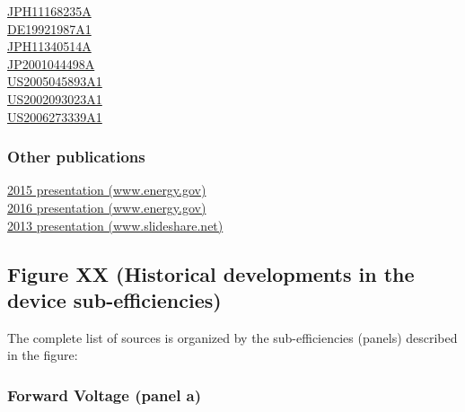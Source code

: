 \documentclass[10pt]{article}
\begin{document}
\href{https://worldwide.espacenet.com/patent/search?q=pn\%3DJPH11168235A}{JPH11168235A} \\
\href{https://worldwide.espacenet.com/patent/search?q=pn\%3DDE19921987A1}{DE19921987A1} \\
\href{https://worldwide.espacenet.com/patent/search?q=pn\%3DJPH11340514A}{JPH11340514A} \\
\href{https://worldwide.espacenet.com/patent/search?q=pn\%3DJP2001044498A}{JP2001044498A} \\ 
\href{https://worldwide.espacenet.com/patent/search?q=pn\%3DUS2005045893A1}{US2005045893A1} \\ 
\href{https://worldwide.espacenet.com/patent/search?q=pn\%3DUS2002093023A1}{US2002093023A1} \\
\href{https://worldwide.espacenet.com/patent/search?q=pn\%3DUS2006273339A1}{US2006273339A1} 

\subsubsection{Other publications}

\href{https://web.archive.org/web/20170801160530/https://www.energy.gov/sites/prod/files/2015/02/f19/craford_innovation_sanfrancisco2015.pdf}{2015 presentation (www.energy.gov)} \\
\href{https://web.archive.org/web/20170715230721/https://www.energy.gov/sites/prod/files/2016/02/f29/sun_china_raleigh2016.pdf}{2016 presentation (www.energy.gov)} \\
\href{http://web.archive.org/web/20160425025936/https://www.slideshare.net/Yole_Developpement/yole-led-packagingjanuary2013reportsample}{2013 presentation (www.slideshare.net)}

\subsection{Figure XX (Historical developments in the device sub-efficiencies)}

The complete list of sources is organized by the sub-efficiencies (panels) described in the figure:

\subsubsection{Forward Voltage (panel a)}

\cite{nichia2001data}\cite{lumi2002data}\cite{gen2005data}\cite{candlepwr2005data}\cite{lumi2006data}\cite{lumi2007data}\cite{nichia2008data}\cite{lumi2008data}\cite{osram2008data}\cite{jeong2011high}\cite{osram2012data}\cite{osram2013data}\cite{osram2014data}\cite{lumi2016data_1}\cite{lumi2016data_2}\cite{epistar2017data}\cite{osram2017data_1}\cite{osram2017data_2}\cite{samsung2017data}\cite{samsung2018data}\cite{osram2018data}\cite{epistar2018data}\cite{lumi2019data}
\end{document}
